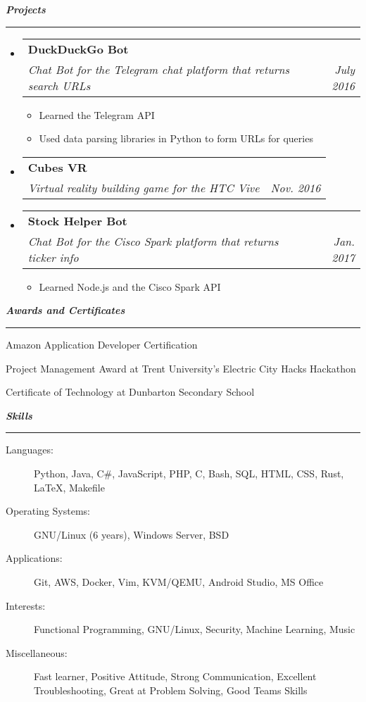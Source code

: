 \documentclass[letterpaper,11pt]{article}
\makeatletter
\newcommand{\resitem}[1]{\item #1 \vspace{-2pt}}
\newcommand{\mysection}[1]{\vspace{5pt} {\bfseries \textsl{#1}} \\ {\color{gray} \rule[5pt]{\textwidth}{1pt}}}
\newcommand{\ressubheading}[4]{\begin{tabular*}{6.5in}{l@{\extracolsep{\fill}}r}
        \textbf{#1} & #2 \\
        \textit{#3} & \textit{#4} \\
\end{tabular*}\vspace{-6pt}}
\makeatother
\begin{document}
\mysection{Projects}
\begin{itemize}
    \item
        \ressubheading{DuckDuckGo Bot}{}{Chat Bot for the Telegram chat platform that returns search URLs}{July 2016}
        \begin{itemize}
                \resitem{Learned the Telegram API}
                \resitem{Used data parsing libraries in Python to form URLs for queries}
        \end{itemize}

    \item
        \ressubheading{Cubes VR}{}{Virtual reality building game for the HTC Vive}{Nov. 2016}

    \item
        \ressubheading{Stock Helper Bot}{}{Chat Bot for the Cisco Spark platform that returns ticker info}{Jan. 2017}
        \begin{itemize}
                \resitem{Learned Node.js and the Cisco Spark API}
        \end{itemize}
\end{itemize}

\mysection{Awards and Certificates}
\begin{description}
    \item Amazon Application Developer Certification
    \item Project Management Award at Trent University's Electric City Hacks Hackathon
    \item Certificate of Technology at Dunbarton Secondary School
\end{description}

\mysection{Skills}
\begin{description}
    \item[Languages:]
        Python, Java, C\#, JavaScript, PHP, C, Bash, SQL, HTML, CSS, Rust, \LaTeX{}, Makefile
    \item[Operating Systems:]
        GNU/Linux (6 years), Windows Server, BSD
    \item[Applications:]
        Git, AWS, Docker, Vim, KVM/QEMU, Android Studio, MS Office
    \item[Interests:]
        Functional Programming, GNU/Linux, Security, Machine Learning, Music
    \item[Miscellaneous:]
        Fast learner, Positive Attitude, Strong Communication, Excellent Troubleshooting, Great at Problem Solving, Good Teams Skills
\end{description}
\end{document}
